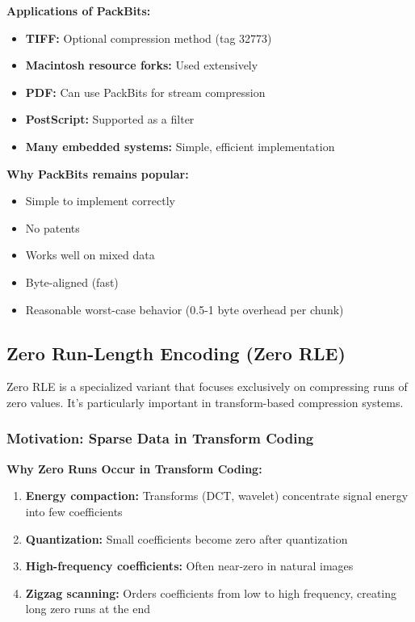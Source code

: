 \begin{importantbox}
\textbf{Applications of PackBits:}

\begin{itemize}
    \item \textbf{TIFF:} Optional compression method (tag 32773)
    \item \textbf{Macintosh resource forks:} Used extensively
    \item \textbf{PDF:} Can use PackBits for stream compression
    \item \textbf{PostScript:} Supported as a filter
    \item \textbf{Many embedded systems:} Simple, efficient implementation
\end{itemize}

\textbf{Why PackBits remains popular:}
\begin{itemize}
    \item Simple to implement correctly
    \item No patents
    \item Works well on mixed data
    \item Byte-aligned (fast)
    \item Reasonable worst-case behavior (0.5-1 byte overhead per chunk)
\end{itemize}
\end{importantbox}

\newpage
\subsection{Zero Run-Length Encoding (Zero RLE)}

Zero RLE is a specialized variant that focuses exclusively on compressing runs of zero values. It's particularly important in transform-based compression systems.

\subsubsection{Motivation: Sparse Data in Transform Coding}

\begin{importantbox}
\textbf{Why Zero Runs Occur in Transform Coding:}

\begin{enumerate}
    \item \textbf{Energy compaction:} Transforms (DCT, wavelet) concentrate signal energy into few coefficients
    \item \textbf{Quantization:} Small coefficients become zero after quantization
    \item \textbf{High-frequency coefficients:} Often near-zero in natural images
    \item \textbf{Zigzag scanning:} Orders coefficients from low to high frequency, creating long zero runs at the end
\end{enumerate}
\end{importantbox}

